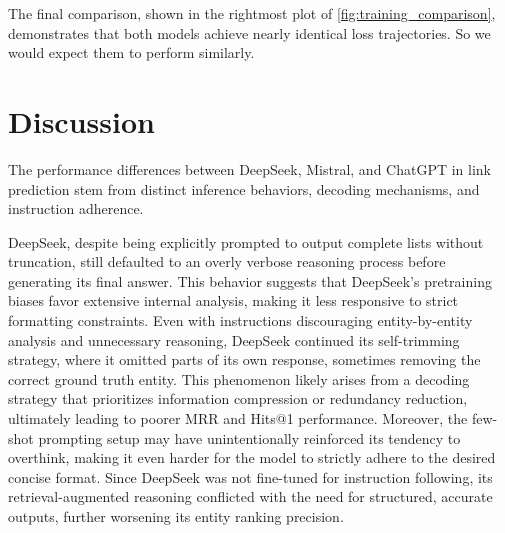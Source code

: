 \documentclass[12pt,a4paper]{article}
\begin{document}
The final comparison, shown in the rightmost plot of \cref{fig:training_comparison}, demonstrates that both models achieve nearly identical loss trajectories.
So we would expect them to perform similarly.




%
%

\section{Discussion}\label{sec:discussion}


The performance differences between DeepSeek, Mistral, and ChatGPT in link prediction stem from distinct inference behaviors, decoding mechanisms, and instruction adherence.

DeepSeek, despite being explicitly prompted to output complete lists without truncation, still defaulted to an overly verbose reasoning process before generating its final answer. This behavior suggests that DeepSeek's pretraining biases favor extensive internal analysis, making it less responsive to strict formatting constraints. Even with instructions discouraging entity-by-entity analysis and unnecessary reasoning, DeepSeek continued its self-trimming strategy, where it omitted parts of its own response, sometimes removing the correct ground truth entity. This phenomenon likely arises from a decoding strategy that prioritizes information compression or redundancy reduction, ultimately leading to poorer MRR and Hits@1 performance. Moreover, the few-shot prompting setup may have unintentionally reinforced its tendency to overthink, making it even harder for the model to strictly adhere to the desired concise format. Since DeepSeek was not fine-tuned for instruction following, its retrieval-augmented reasoning conflicted with the need for structured, accurate outputs, further worsening its entity ranking precision.
\end{document}
